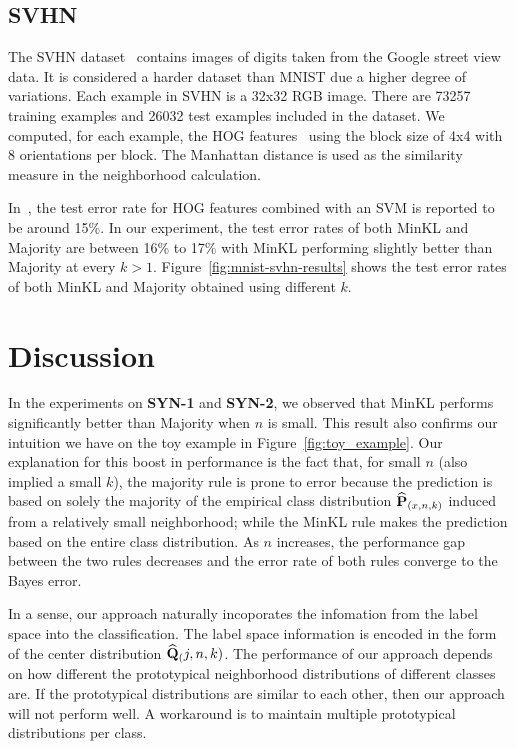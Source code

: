 \documentclass{article}
\begin{document}
\subsection{SVHN}
The SVHN dataset~\cite{Netzer2011} contains images of digits taken
from the Google street view data. It is considered a harder dataset
than MNIST due a higher degree of variations. Each example in SVHN is
a 32x32 RGB image. There are 73257 training examples and 26032 test
examples included in the dataset. We computed, for each example, the
HOG features~\cite{Dalal2005} using the block size of 4x4 with 8
orientations per block. The Manhattan distance is used as the
similarity measure in the neighborhood calculation.

In~\cite{Netzer2011}, the test error rate for HOG features combined
with an SVM is reported to be around 15\%. In our experiment, the test
error rates of both MinKL and Majority are between 16\% to 17\% with
MinKL performing slightly better than Majority at every $k >
1$. Figure~\ref{fig:mnist-svhn-results} shows the test error rates of
both MinKL and Majority obtained using different $k$.

\section{Discussion}
\label{sec:discussion}

In the experiments on \textbf{SYN-1} and \textbf{SYN-2}, we observed
that MinKL performs significantly better than Majority when $n$ is
small. This result also confirms our intuition we have on the toy
example in Figure~\ref{fig:toy_example}. Our explanation for this
boost in performance is the fact that, for small $n$ (also implied a
small $k$), the majority rule is prone to error because the prediction
is based on solely the majority of the empirical class distribution
$\widehat{\mathbf{P}}_{(x,n,k)}$ induced from a relatively small neighborhood; while the MinKL
rule makes the prediction based on the entire class distribution. As
$n$ increases, the performance gap between the two rules decreases and
the error rate of both rules converge to the Bayes error.

In a sense, our approach naturally incoporates the infomation from the
label space into the classification. The label space information is
encoded in the form of the center distribution $\widehat{\mathbf{Q}}_(j,n,k)$. The
performance of our approach depends on how different the prototypical
neighborhood distributions of different classes are. If the
prototypical distributions are similar to each other, then our
approach will not perform well. A workaround is to maintain multiple
prototypical distributions per class.
\end{document}
